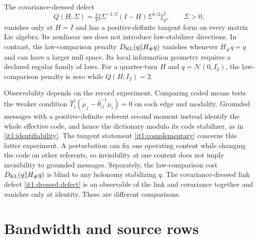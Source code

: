 The covariance-dressed defect
\begin{equation}
Q(H;\Sigma)=\tfrac12\Vert\Sigma^{-1/2}(I-H)\Sigma^{1/2}\Vert_F^2,\qquad \Sigma>0,
\label{it1:dressed-defect}
\end{equation}
vanishes only at $H=I$ and has a positive-definite tangent form on every matrix Lie algebra. Its nonlinear use does not introduce law-stabilizer directions. In contrast, the law-comparison penalty $D_{\mathrm{KL}}(q\Vert H_\#q)$ vanishes whenever $H_\#q=q$ and can have a larger null space. Its local information geometry requires a declared regular family of laws. For a quarter-turn $H$ and $q=\mathcal N(0,I_2)$, the law-comparison penalty is zero while $Q(H;I_2)=2$.

Observability depends on the record experiment. Comparing coded means tests the weaker condition $\bar T_j^c(\mu_j-\bar\theta_{ij}^{-1}\mu_i)=0$ on each edge and modality. Grounded messages with a positive-definite referent second moment instead identify the whole effective code, and hence the dictionary modulo its code stabilizer, as in \cref{it1:identifiability}. The tangent statement \cref{it1:complementary} concerns this latter experiment. A perturbation can fix one operating content while changing the code on other referents, so invisibility at one content does not imply invisibility to grounded messages. Separately, the law-comparison cost $D_{\mathrm{KL}}(q\Vert H_\#q)$ is blind to any holonomy stabilizing $q$. The covariance-dressed link defect \cref{it1:dressed-defect} is an observable of the link and covariance together and vanishes only at identity. These are different comparisons.

\section{Bandwidth and source rows}
\label{it1:ch-bandwidth}

